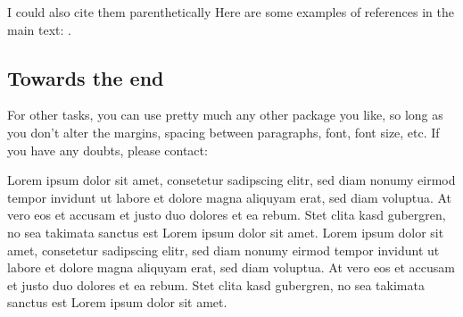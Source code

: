\documentclass[a4paper,12pt,twoside]{article}
\begin{document}
I could also cite them parenthetically Here are some examples of references in the main text: \citet{Montague73, HeimKratzer98}. 



\newpage
\subsection{Towards the end}

For other tasks, you can use pretty much any other package you like, so long as you don't alter the margins, spacing between paragraphs, font, font size, etc.  If you have any doubts, please contact: 




\newpage

Lorem ipsum dolor sit amet, consetetur sadipscing elitr, sed diam nonumy eirmod tempor invidunt ut labore et dolore magna aliquyam erat, sed diam voluptua. At vero eos et accusam et justo duo dolores et ea rebum. Stet clita kasd gubergren, no sea takimata sanctus est Lorem ipsum dolor sit amet. Lorem ipsum dolor sit amet, consetetur sadipscing elitr, sed diam nonumy eirmod tempor invidunt ut labore et dolore magna aliquyam erat, sed diam voluptua. At vero eos et accusam et justo duo dolores et ea rebum. Stet clita kasd gubergren, no sea takimata sanctus est Lorem ipsum dolor sit amet.
\end{document}
